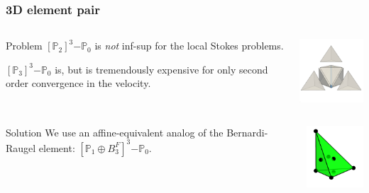 \documentclass[presentation]{beamer}
\newcommand{\PtwothreePzero}{\ensuremath{[\mathbb{P}_2]^3\mathrm{-}\mathbb{P}_0}\xspace}
\newcommand{\PthreePzero}{\ensuremath{[\mathbb{P}_3]^3\mathrm{-}\mathbb{P}_0}\xspace}
\newcommand{\BR}{\ensuremath{\left[\mathbb{P}_1 \oplus B^F_3\right]}\xspace}
\newcommand{\BRzero}{\ensuremath{\BR^3\mathrm{-}\mathbb{P}_0}\xspace}
\begin{document}
\begin{frame}
  \frametitle{3D element pair}
  \begin{columns}
    \begin{column}{0.6\textwidth}
      \begin{block}{Problem}
        $\PtwothreePzero$ is \emph{not} inf-sup for the local Stokes problems.

        $\PthreePzero$ is, but is tremendously expensive for only
        second order convergence in the velocity.
      \end{block}
    \end{column}
    \begin{column}{0.38\textwidth}
      \begin{center}
        \includegraphics[width=3.5cm]{exploded_tet}
      \end{center}
    \end{column}
  \end{columns}

  \begin{columns}
    \begin{column}{0.6\textwidth}
      \begin{block}{Solution}
        We use an affine-equivalent analog of the Bernardi-Raugel
        element: $\BRzero$.
      \end{block}
    \end{column}
    \begin{column}{0.38\textwidth}
      \begin{center}
        \includegraphics[width=3cm]{P1FB}
      \end{center}
    \end{column}
  \end{columns}
\end{frame}
\end{document}
